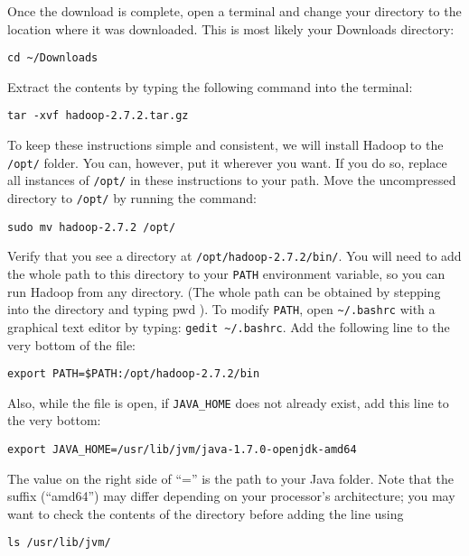 \documentclass[10pt]{article}
\begin{document}
Once the download is complete, open a terminal and change your directory to the location where it was downloaded. This is most likely your Downloads directory:

\begin{verbatim}
cd ~/Downloads
\end{verbatim}

Extract the contents by typing the following command into the terminal:

\begin{verbatim}
tar -xvf hadoop-2.7.2.tar.gz
\end{verbatim}

To keep these instructions simple and consistent, we will install Hadoop to the \texttt{/opt/} folder.  You can, however, put it wherever you want.  If you do so, replace all instances of \texttt{/opt/} in these instructions to your path. Move the uncompressed directory to \texttt{/opt/} by running the command:

\begin{verbatim}
sudo mv hadoop-2.7.2 /opt/
\end{verbatim}

Verify that you see a directory at \texttt{/opt/hadoop-2.7.2/bin/}. You will need to add the whole path to this directory to your \texttt{PATH} environment variable, so you can run Hadoop from any directory. (The whole path can be obtained by stepping into the directory and typing pwd ). To modify \texttt{PATH}, open \texttt{\~{}/.bashrc} with a graphical text editor by typing: \texttt{gedit \~{}/.bashrc}. Add the following line to the very bottom of the file: 

\begin{verbatim}
export PATH=$PATH:/opt/hadoop-2.7.2/bin
\end{verbatim}

Also, while the file is open, if \texttt{JAVA\_HOME} does not already exist, add this line to the very bottom:

\begin{verbatim}
export JAVA_HOME=/usr/lib/jvm/java-1.7.0-openjdk-amd64
\end{verbatim}
The value on the right side of ``='' is the path to your Java folder. Note that the suffix (``amd64'') may differ depending on your processor's architecture; you may want to check the contents of the directory before adding the line using

\begin{verbatim}
ls /usr/lib/jvm/
\end{verbatim}
   
\end{document}
